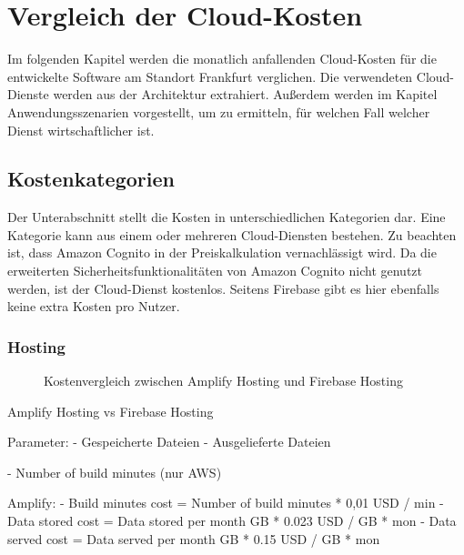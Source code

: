 \chapter{Vergleich der Cloud-Kosten}

Im folgenden Kapitel werden die monatlich anfallenden Cloud-Kosten \autocite{awsPricing} \autocite{gcpPricing} für die entwickelte Software am Standort Frankfurt verglichen. Die verwendeten Cloud-Dienste werden aus der Architektur extrahiert. Außerdem werden im Kapitel Anwendungsszenarien vorgestellt, um zu ermitteln, für welchen Fall welcher Dienst wirtschaftlicher ist.

\section{Kostenkategorien}

Der Unterabschnitt stellt die Kosten in unterschiedlichen Kategorien dar. Eine Kategorie kann aus einem oder mehreren Cloud-Diensten bestehen. Zu beachten ist, dass Amazon Cognito in der Preiskalkulation vernachlässigt wird. Da die erweiterten Sicherheitsfunktionalitäten von Amazon Cognito nicht genutzt werden, ist der Cloud-Dienst kostenlos. Seitens Firebase gibt es hier ebenfalls keine extra Kosten pro Nutzer.

\subsection{Hosting}

\begin{figure}%
    \centering
    \qquad
    \caption{Kostenvergleich zwischen Amplify Hosting und Firebase Hosting}%
    \label{kostenvergleichHosting}%
\end{figure}

Amplify Hosting vs Firebase Hosting

Parameter:
- Gespeicherte Dateien
- Ausgelieferte Dateien

- Number of build minutes (nur AWS)


Amplify:
- Build minutes cost = Number of build minutes * 0,01 USD / min
- Data stored cost = Data stored per month GB * 0.023 USD / GB * mon
- Data served cost = Data served per month GB * 0.15 USD / GB * mon

